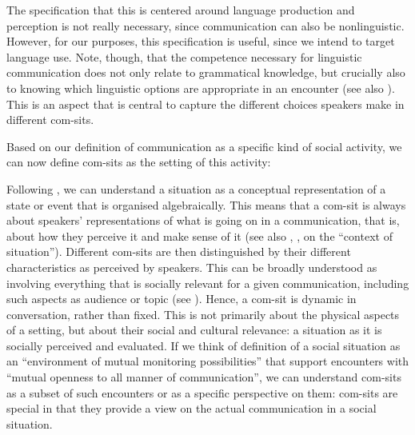 The specification that this is centered around language production and perception is not really necessary, since communication can also be nonlinguistic. However, for our purposes, this specification is useful, since we intend to target language use. Note, though, that the competence necessary for linguistic communication does not only relate to grammatical knowledge, but crucially also to knowing which linguistic options are appropriate in an encounter (see also \citealt{Ruuska2019}). This is an aspect that is central to capture the different choices speakers make in different com-sits.



Based on our definition of communication as a specific kind of social activity, we can now define com-sits as the setting of this activity:


Following \citet{Pinango2019}, we can understand a situation as a conceptual representation of a state or event that is organised algebraically. This means that a com-sit is always about speakers’ representations of what is going on in a communication, that is, about how they perceive it and make sense of it (see also \citealt{Malinowski1923}, \citealt{Firth1957}, \citealt{Halliday1978} on the “context of situation”). Different com-sits are then distinguished by their different characteristics as perceived by speakers. This can be broadly understood as involving everything that is socially relevant for a given communication, including such aspects as audience or topic (see \citealt{LepageTabouretkeller1985}). Hence, a com-sit is dynamic in conversation, rather than fixed. This is not primarily about the physical aspects of a setting, but about their social and cultural relevance: a situation as it is socially perceived and evaluated. If we think of  definition of a social situation as an “environment of mutual monitoring possibilities” that support encounters with “mutual openness to all manner of communication”, we can understand com-sits as a subset of such encounters or as a specific perspective on them: com-sits are special in that they provide a view on the actual communication in a social situation.

